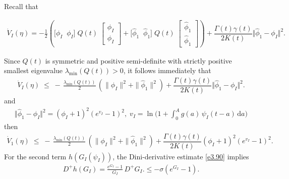 \documentclass[10pt, a4paper]{amsart}
\makeatletter
\theoremstyle{plain}
\theoremstyle{definition}
\theoremstyle{remark}
\renewenvironment{proof}[1][\proofname]{\par
  \pushQED{\qed}%
  \normalfont \topsep6\p@\@plus6\p@\relax
  \trivlist
  \item[\hskip\labelsep
        \itshape
    #1\ \ref{#1}.]\ignorespaces
}{%
  \popQED\endtrivlist\@endpefalse
}
\numberwithin{equation}{section}
\makeatother
\begin{document}
 \begin{proof}[of Theorem \ref{th3.8}]
Recall that

\begin{align*}
\dot V_{I}(\eta)
= -\frac{1}{2}\left(\bigl[\phi_{I}\;\;\phi_{I}\bigr]
  \;Q(t)\;
  \begin{bmatrix}\phi_{I} \\[4pt]\phi_{I}\end{bmatrix}+\bigl[\hat{\phi}_{1}\;\;\hat{\phi}_{1}\bigr]
  \;Q(t)\;
  \begin{bmatrix}\hat{\phi}_{1} \\[4pt]\hat{\phi}_{1}\end{bmatrix}\right)+\dfrac{\Gamma(t)\gamma(t)}{2K(t)}\Vert \hat{\phi}_{1}-\phi_I\Vert^2.
\end{align*}


Since $Q(t)$ is symmetric and positive semi-definite with strictly positive smallest eigenvalue $\lambda_{\min}(Q(t))>0$, it follows immediately that
\begin{align}\label{e93}
    \dot V_{I}(\eta)\;\le\; -\,\frac{\lambda_{\min}(Q(t))}{2}\,(\|\phi_I\|^{2}+\|\hat{\phi}_1\|^{2})+\dfrac{\Gamma(t)\gamma(t)}{2K(t)}\Vert \hat{\phi}_{1}-\phi_I\Vert^2.
\end{align}
and 
\begin{align}\label{e3.94}
    \Vert \hat{\phi}_{1}-\phi_I\Vert^2=(\phi_I+1)^2(e^{v_I}-1)^2,\;v_I=\displaystyle\ln\bigl(1+\displaystyle\int_{0}^{A}g(a)\,\psi_{I}(t-a)\,\mathrm{d}a\bigr)
\end{align}
then 
\begin{align}\label{e3.95}
\dot V_{1}(\eta)\;\le\; -\,\frac{\lambda_{\min}(Q(t))}{2}\,(\|\phi_I\|^{2}+\|\hat{\phi}_1\|^{2})+\dfrac{\Gamma(t)\gamma(t)}{2K(t)}(\phi_I+1)^2(e^{v_I}-1)^2.
\end{align}
For the second term $h(G_{I}(\psi_{I}))$, the Dini-derivative estimate \eqref{e3.90} implies
\begin{align}\label{e3.96}
    D^+h(G_I)=\frac{e^{G_I}-1}{G_I}\,D^+G_I.\leq -\sigma (e^{G_I}-1).
\end{align}


\end{proof}
\end{document}
